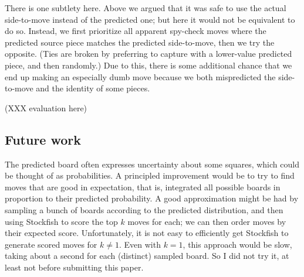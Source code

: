 \documentclass[twocolumn]{amsart}
\begin{document}
There is one subtlety here. Above we argued that it was safe to use
the actual side-to-move instead of the predicted one; but here it
would not be equivalent to do so. Instead, we first prioritize all
apparent spy-check moves where the predicted source piece matches the
predicted side-to-move, then we try the opposite. (Ties are broken by
preferring to capture with a lower-value predicted piece, and then
randomly.) Due to this, there is some additional chance that we end up
making an especially dumb move because we both mispredicted the
side-to-move and the identity of some pieces.

(XXX evaluation here)

\subsection{Future work}

The predicted board often expresses uncertainty about some squares,
which could be thought of as probabilities. A principled improvement
would be to try to find moves that are good in expectation, that is,
integrated all possible boards in proportion to their predicted
probability. A good approximation might be had by sampling a bunch
of boards according to the predicted distribution, and then using
Stockfish to score the top $k$ moves for each; we can then order
moves by their expected score. Unfortunately, it is not easy to
efficiently get Stockfish to generate scored moves for $k \neq 1$.
Even with $k = 1$, this approach would be slow, taking about a
second for each (distinct) sampled board. So I did not try it,
at least not before submitting this paper.
\end{document}
